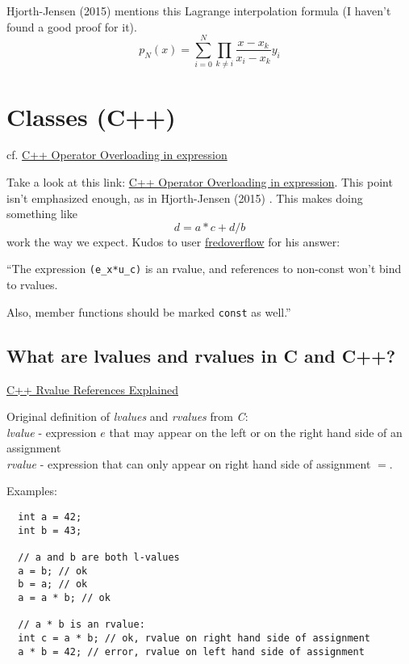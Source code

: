 \documentclass[10pt]{amsart}
\begin{document}
\begin{multicols*}{2}
Hjorth-Jensen (2015) \cite{Hjor2015} mentions this Lagrange interpolation formula (I haven't found a good proof for it).  
\begin{equation}
\boxed{ p_N(x) = \sum_{i=0}^N \prod_{k\neq i} \frac{ x-x_k}{x_i - x_k} y_i  }
\end{equation}

\section{Classes (C++)}

cf. \href{http://stackoverflow.com/questions/6377786/c-operator-overloading-in-expression}{C++ Operator Overloading in expression}

Take a look at this link: \href{http://stackoverflow.com/questions/6377786/c-operator-overloading-in-expression}{C++ Operator Overloading in expression}.  This point isn't emphasized enough, as in Hjorth-Jensen (2015) \cite{Hjor2015}.  This makes doing something like
\[
d = a*c + d/b
\]
work the way we expect.  Kudos to user \href{http://stackoverflow.com/users/252000/fredoverflow}{fredoverflow} for his answer:

``The expression \verb|(e_x*u_c)| is an rvalue, and references to non-const won't bind to rvalues.

Also, member functions should be marked \verb|const| as well.''  

\subsection{What are lvalues and rvalues in C and C++?}

\href{http://thbecker.net/articles/rvalue_references/section_01.html}{C++ Rvalue References Explained}

Original definition of \emph{lvalues} and \emph{rvalues} from \emph{C}: \\
\emph{lvalue} - expression $e$ that may appear on the left or on the right hand side of an assignment \\
\emph{rvalue} - expression that can only appear on right hand side of assignment $=$.

Examples:

\begin{lstlisting}
  int a = 42;
  int b = 43;

  // a and b are both l-values
  a = b; // ok
  b = a; // ok
  a = a * b; // ok

  // a * b is an rvalue:
  int c = a * b; // ok, rvalue on right hand side of assignment
  a * b = 42; // error, rvalue on left hand side of assignment
  

\end{lstlisting}
\end{multicols*}
\end{document}
